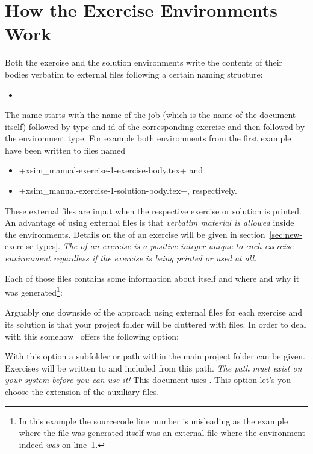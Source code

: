 \documentclass{xsim-manual}
\begin{document}
\section{How the Exercise Environments Work}\label{sec:how-exerc-envir}
Both the exercise and the solution environments write the contents of their
bodies verbatim to external files following a certain naming structure:
\begin{itemize}
  \item
\end{itemize}
The name starts with the name of the job (which is the name of the document
itself) followed by type and id of the corresponding exercise and then
followed by the environment type.  For example both environments from the first
example have been written to files named
\begin{itemize}
  \item \verbcode+xsim_manual-exercise-1-exercise-body.tex+ and
  \item \verbcode+xsim_manual-exercise-1-solution-body.tex+, respectively.
\end{itemize}
These external files are input when the respective exercise or solution is
printed.  An advantage of using external files is that \emph{verbatim material
  is allowed} inside the environments.  Details on the  of an
exercise will be given in section~\vref{sec:new-exercise-types}.  \emph{The
   of an exercise is a positive integer unique to each exercise
  environment regardless if the exercise is being printed or used at all.}

Each of those files contains some information about itself and where and why
it was generated\footnote{In this example the sourcecode line number is
  misleading as the example where the file was generated itself was an
  external file where the  environment indeed \emph{was} on
  line~1.}:


Arguably one downside of the approach using external files for each exercise
and its solution is that your project folder will be cluttered with files.  In
order to deal with this somehow \xsim\ offers the following option:
\begin{options}
  \Default
    With this option a subfolder or path within the main project folder can be
    given.  Exercises will be written to and included from this path.
    \emph{The path must exist on your system before you can use it!} This
    document uses .
    This option let's you choose the extension of the
    auxiliary files.
\end{options}
\end{document}

